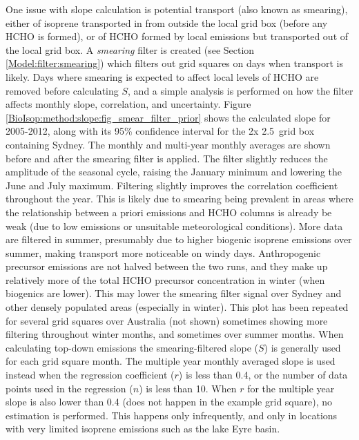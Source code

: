     One issue with slope calculation is potential transport (also known as smearing), either of isoprene transported in from outside the local grid box (before any HCHO is formed), or of HCHO formed by local emissions but transported out of the local grid box.
    A \textit{smearing} filter is created (see Section \ref{Model:filter:smearing}) which filters out grid squares on days when transport is likely.
    Days where smearing is expected to affect local levels of HCHO are removed before calculating $S$, and a simple analysis is performed on how the filter affects monthly slope, correlation, and uncertainty.
    Figure \ref{BioIsop:method:slope:fig_smear_filter_prior} shows the calculated slope for 2005-2012, along with its 95\% confidence interval for the 2\degr x 2.5\degr ~grid box containing Sydney.
    The monthly and multi-year monthly averages are shown before and after the smearing filter is applied.
    The filter slightly reduces the amplitude of the seasonal cycle, raising the January minimum and lowering the June and July maximum.
    Filtering slightly improves the correlation coefficient throughout the year.
    This is likely due to smearing being prevalent in areas where the relationship between a priori emissions and HCHO columns is already be weak (due to low emissions or unsuitable meteorological conditions).
    More data are filtered in summer, presumably due to higher biogenic isoprene emissions over summer, making transport more noticeable on windy days.
    Anthropogenic precursor emissions are not halved between the two runs, and they make up relatively more of the total HCHO precursor concentration in winter (when biogenics are lower).
    This may lower the smearing filter signal over Sydney and other densely populated areas (especially in winter).
    This plot has been repeated for several grid squares over Australia (not shown) sometimes showing more filtering throughout winter months, and sometimes over summer months.
    When calculating top-down emissions the smearing-filtered slope ($S$) is generally used for each grid square month.
    The multiple year monthly averaged slope is used instead when the regression coefficient ($r$) is less than 0.4, or the number of data points used in the regression ($n$) is less than 10.
    When $r$ for the multiple year slope is also lower than 0.4 (does not happen in the example grid square), no estimation is performed.%
    This happens only infrequently, and only in locations with very limited isoprene emissions such as the lake Eyre basin.
    
